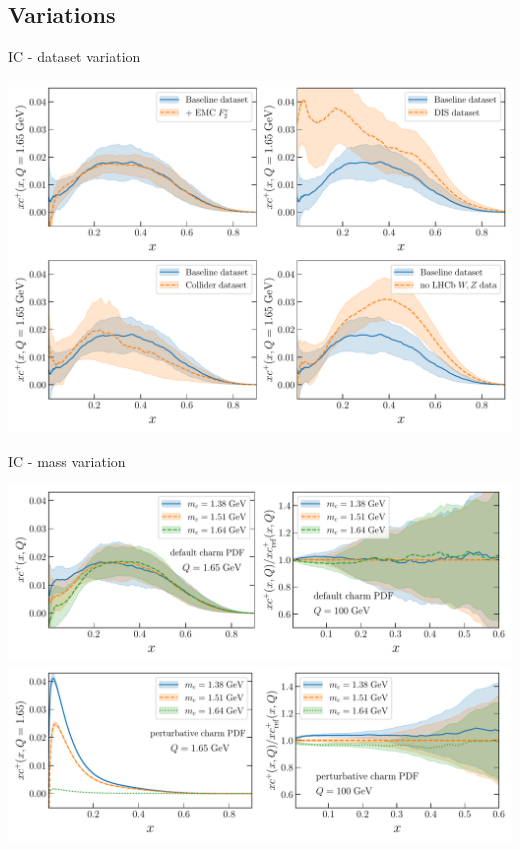 \documentclass[9pt]{beamer}
\begin{document}
\subsection{Variations}
\begin{frame}{IC - dataset variation}
	\begin{center}
		\includegraphics[width=\linewidth]{pdfplot-abscharm-dataset_dep.pdf}
	\end{center}
\end{frame}
\begin{frame}{IC - mass variation}
	\begin{center}
		\includegraphics[width=\linewidth]{pdfplot-abscharm-mcdep.pdf}\\%
		\includegraphics[width=\linewidth]{pdfplot-abscharm-mcdep-highQ.pdf}
	\end{center}
\end{frame}
\end{document}

